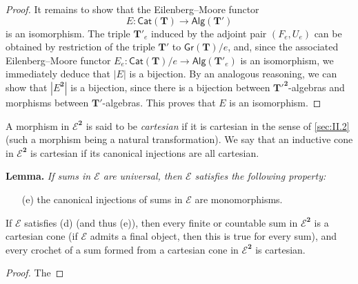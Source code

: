 \documentclass[fleqn]{article}
\newenvironment{itenv}[1]
  {\phantomsection\par\medskip\noindent\textbf{#1.}\itshape}
  {\par\medskip}
\newcommand{\oldpage}[1]{\marginpar{\footnotesize$\Big\vert$ \textit{p.~#1}}}
\newcommand{\TT}{\mathbf{T}}
\newcommand{\cat}[1]{\mathcal{#1}}
\newcommand{\Cat}[1]{\mathsf{#1}}
\newcommand{\set}[1]{|#1|}
\newcommand{\Gr}[1]{\Cat{Gr}(#1)}
\newcommand{\Alg}[1]{\Cat{Alg}(#1)}
\begin{document}
\begin{proof}
  It remains to show that the Eilenberg--Moore functor
  \[
    E\colon\Cat{Cat}(\TT)
    \to \Alg{\TT'}
  \]
  is an isomorphism.
  \oldpage{269}
  The triple $\TT'_e$ induced by the adjoint pair $(F_e,U_e)$ can be obtained by restriction of the triple $\TT'$ to $\Gr{\TT}/e$, and, since the associated Eilenberg--Moore functor $E_e\colon\Cat{Cat}(\TT)/e\to\Alg{\TT'_e}$ is an isomorphism, we immediately deduce that $\set{E}$ is a bijection.
  By an analogous reasoning, we can show that $\set{E^\mathbf{2}}$ is a bijection, since there is a bijection between ${\TT'}^\mathbf{2}$-algebras and morphisms between $\TT'$-algebras.
  This proves that $E$ is an isomorphism.
\end{proof}

A morphism in $\cat{E}^\mathbf{2}$ is said to be \emph{cartesian} if it is cartesian in the sense of \cref{sec:II.2} (such a morphism being a natural transformation).
We say that an inductive cone in $\cat{E}^\mathbf{2}$ is cartesian if its canonical injections are all cartesian.

\begin{itenv}{Lemma}
  If sums in $\cat{E}$ are universal, then $\cat{E}$ satisfies the following property:
  \begin{enumerate}
    \item[(e)] the canonical injections of sums in $\cat{E}$ are monomorphisms.
  \end{enumerate}
  If $\cat{E}$ satisfies (d) (and thus (e)), then every finite or countable sum in $\cat{E}^\mathbf{2}$ is a cartesian cone (if $\cat{E}$ admits a final object, then this is true for every sum), and every crochet of a sum formed from a cartesian cone in $\cat{E}^\mathbf{2}$ is cartesian.
\end{itenv}

\begin{proof}
  The
\end{proof}






\nocite{*}
\printbibliography[heading=bibintoc,title=Bibliography]
\end{document}
